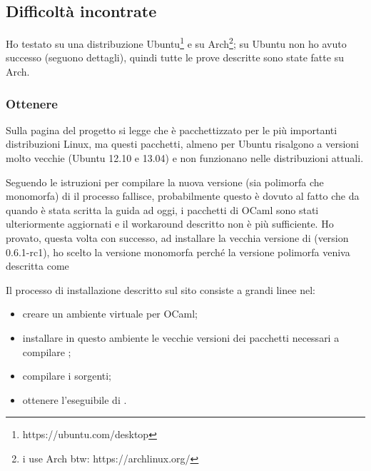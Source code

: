 \subsection{Difficoltà incontrate}
Ho testato \cduce su una distribuzione Ubuntu\footnote{https://ubuntu.com/desktop} e su Arch\footnote{i use Arch btw: https://archlinux.org/}; su Ubuntu non ho avuto successo (seguono dettagli), quindi tutte le prove descritte sono state fatte su Arch.
\subsubsection{Ottenere \cduce}
Sulla pagina del progetto si legge che \cduce è pacchettizzato per le più importanti distribuzioni Linux, ma questi pacchetti, almeno per Ubuntu risalgono a versioni molto vecchie (Ubuntu 12.10 e 13.04) e non funzionano nelle distribuzioni attuali.

Seguendo le istruzioni per compilare la nuova versione (sia polimorfa che monomorfa) di \cduce il processo fallisce, probabilmente questo è dovuto al fatto che da quando è stata scritta la guida ad oggi, i pacchetti di OCaml sono stati ulteriormente aggiornati e il workaround descritto non è più sufficiente. Ho provato, questa volta con successo, ad installare la vecchia versione di \cduce (version 0.6.1-rc1), ho scelto la versione monomorfa perché la versione polimorfa veniva descritta come 

Il processo di installazione descritto sul sito consiste a grandi linee nel:
\begin{itemize}
	\item creare un ambiente virtuale per OCaml;
	\item installare in questo ambiente le vecchie versioni dei pacchetti necessari a compilare \cduce;
	\item compilare i sorgenti;
	\item ottenere l'eseguibile di \cduce.
\end{itemize}
